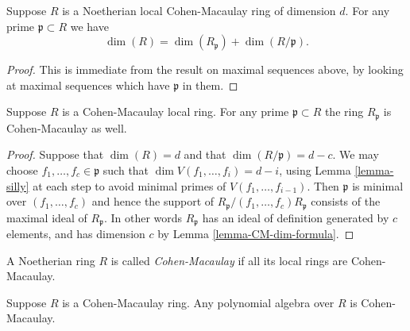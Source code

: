 \begin{lemma}
\label{lemma-CM-dim-formula}
Suppose $R$ is a Noetherian local Cohen-Macaulay ring of dimension $d$.
For any prime $\mathfrak p \subset R$ we have
$$
\dim(R) = \dim(R_{\mathfrak p}) + \dim(R/\mathfrak p).
$$
\end{lemma}

\begin{proof}
This is immediate from the result on maximal sequences
above, by looking at maximal sequences which have $\mathfrak p$
in them.
\end{proof}

\begin{lemma}
\label{lemma-localize-CM}
Suppose $R$ is a Cohen-Macaulay local ring.
For any prime $\mathfrak p \subset R$ the
ring $R_{\mathfrak p}$ is Cohen-Macaulay as well.
\end{lemma}

\begin{proof}
Suppose that $\dim(R) = d$ and that $\dim(R/\mathfrak p) = d - c$.
We may choose $f_1, \ldots, f_c \in \mathfrak p$ such that
$\dim V(f_1, \ldots, f_i) = d - i$, using Lemma \ref{lemma-silly}
at each step to avoid minimal primes of $V(f_1, \ldots, f_{i-1})$.
Then $\mathfrak p$ is minimal over $(f_1, \ldots, f_c)$ and hence
the support of $R_{\mathfrak p}/(f_1, \ldots, f_c)R_{\mathfrak p}$ consists
of the maximal ideal of $R_{\mathfrak p}$. In other words
$R_{\mathfrak p}$ has an ideal of definition generated by
$c$ elements, and has dimension $c$ by Lemma \ref{lemma-CM-dim-formula}.
\end{proof}

\begin{definition}
\label{definition-ring-CM}
A Noetherian ring $R$ is called {\it Cohen-Macaulay} if all
its local rings are Cohen-Macaulay.
\end{definition}

\begin{lemma}
\label{lemma-CM-polynomial-algebra}
Suppose $R$ is a Cohen-Macaulay ring.
Any polynomial algebra over $R$ is Cohen-Macaulay.
\end{lemma}

